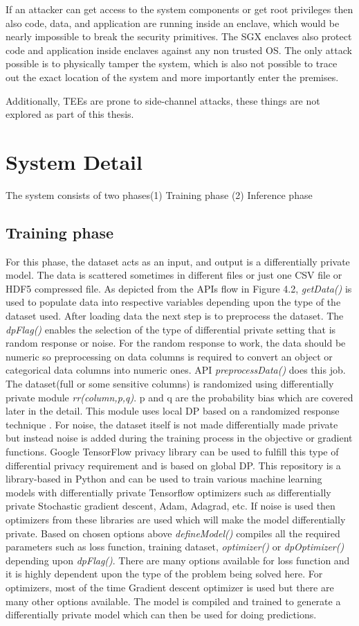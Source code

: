 If an attacker can get access to the system components or get root privileges then also code, data, and application are running inside an enclave, which would be nearly impossible to break the security primitives. The SGX enclaves also protect code and application inside enclaves against any non trusted OS. The only attack possible is to physically tamper the system, which is also not possible to trace out the exact location of the system and more importantly enter the premises.

Additionally, TEEs are prone to side-channel attacks, these things are not explored as part of this thesis.
\section{System Detail}
The system consists of two phases(1) Training phase (2) Inference phase
\subsection{Training phase}
For this phase, the dataset acts as an input, and output is a differentially private model. The data is scattered sometimes in different files or just one CSV file or HDF5 compressed file. As depicted from the APIs flow in Figure 4.2, \textit{getData()} is used to populate data into respective variables depending upon the type of the dataset used. After loading data the next step is to preprocess the dataset. The \textit{dpFlag()} enables the selection of the type of differential private setting that is random response or noise. For the random response to work, the data should be numeric so preprocessing on data columns is required to convert an object or categorical data columns into numeric ones. API \textit{preprocessData()} does this job. The dataset(full or some sensitive columns) is randomized using differentially private module  \textit{rr(column,p,q)}. p and q are the probability bias which are covered later in the detail. This module uses local DP based on a randomized response technique \cite{14}. For noise, the dataset itself is not made differentially made private but instead noise is added during the training process in the objective or gradient functions. Google TensorFlow privacy library \cite{11} can be used to fulfill this type of differential privacy requirement and is based on global DP. This repository is a library-based in Python and can be used to train various machine learning models with differentially private Tensorflow optimizers such as differentially private Stochastic gradient descent, Adam, Adagrad, etc. If noise is used then optimizers from these libraries are used which will make the model differentially private. Based on chosen options above \textit{defineModel()} compiles all the required parameters such as loss function, training dataset, \textit{optimizer()} or \textit{dpOptimizer()} depending upon \textit{dpFlag()}. There are many options available for loss function and it is highly dependent upon the type of the problem being solved here. For optimizers, most of the time Gradient descent optimizer is used but there are many other options available. The model is compiled and trained to generate a differentially private model which can then be used for doing predictions. 

